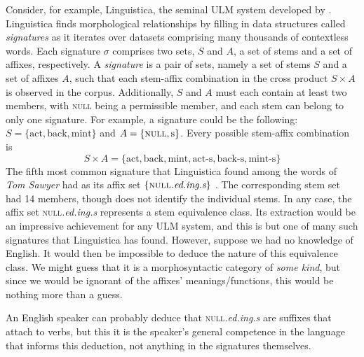 Consider, for example, Linguistica, the seminal 
ULM  system developed by \cite{goldsmith:2001, goldsmith:2006}. 
Linguistica finds morphological relationships by filling in 
data structures 
called \emph{signatures} as it iterates over datasets comprising many
thousands of contextless words. Each signature $\sigma$ 
comprises 
two sets, $S$ and $A$, a set of stems and a set of affixes, 
respectively.
A \emph{signature} is a pair of sets, namely a set of stems $S$ and 
a set of affixes $A$, such that each stem-affix combination in the cross 
product $S \times A$ is observed in the corpus. Additionally, $S$ and 
$A$ must each contain at least two members, with \textsc{null} being 
a permissible member, and each stem can belong to only one signature.  
For example, a signature could be the following: $S = \{ \text{act}, \text{back}, \text{mint} \}$ 
and $A = \{ \textsc{null}, \text{s}\}$. Every possible stem-affix combination is 
\begin{equation}
\label{eq:SxA}
S \times A = \{ \text{act}, \text{back}, \text{mint}, \text{act-s}, 
\text{back-s}, \text{mint-s}\}
\end{equation}
The fifth 
most common signature that Linguistica found among the words of 
\textit{Tom Sawyer} had as its affix set $\{\textsc{null}\textit{.ed.ing.s}\}$ \citep{goldsmith:2001}. 
The corresponding stem set had 14 members, though \citet{goldsmith:2001} 
does not identify the individual stems. 
In any case, the affix set \textsc{null}\textit{.ed.ing.s} represents 
a stem equivalence class. Its extraction would be an impressive achievement for any ULM system, and this
is but one of many such signatures that Linguistica has found. However, 
suppose we had no knowledge of English. It would then be impossible to deduce the nature 
of this equivalence class. We might
guess that it is a morphosyntactic category of \emph{some kind}, but since we would be ignorant
of the affixes' meanings/functions, this would be nothing more than a guess. 

An English speaker can probably deduce that \textsc{null}\textit{.ed.ing.s} are suffixes that attach to verbs,
but this it is the speaker's general competence in the language that informs this deduction, not anything in the 
signatures themselves.

